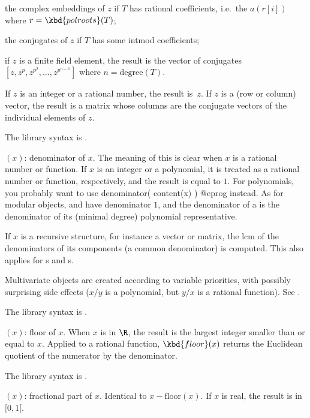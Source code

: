 \item the complex embeddings of $z$ if $T$ has rational coefficients,
i.e.~the $a(r[i])$ where $r = \kbd{polroots}(T)$;

\item the conjugates of $z$ if $T$ has some intmod coefficients;

\noindent if $z$ is a finite field element, the result is the vector of
conjugates $[z,z^p,z^{p^2},\ldots,z^{p^{n-1}}]$ where $n=\text{degree}(T)$.

\noindent If $z$ is an integer or a rational number, the result is~$z$. If
$z$ is a (row or column) vector, the result is a matrix whose columns are
the conjugate vectors of the individual elements of $z$.

The library syntax is .

$(x)$: \label{se:denominator}
denominator of $x$. The meaning of this
is clear when $x$ is a rational number or function. If $x$ is an integer
or a polynomial, it is treated as a rational number or function,
respectively, and the result is equal to $1$. For polynomials, you
probably want to use
\bprog
denominator( content(x) )
@eprog\noindent
instead. As for modular objects,  and  have
denominator $1$, and the denominator of a  is the denominator
of its (minimal degree) polynomial representative.

If $x$ is a recursive structure, for instance a vector or matrix, the lcm
of the denominators of its components (a common denominator) is computed.
This also applies for s and s.

 Multivariate objects are created according to variable
priorities, with possibly surprising side effects ($x/y$ is a polynomial, but
$y/x$ is a rational function). See .

The library syntax is .

$(x)$: \label{se:floor}
floor of $x$. When $x$ is in $\R$, the result is the
largest integer smaller than or equal to $x$. Applied to a rational function,
$\kbd{floor}(x)$ returns the Euclidean quotient of the numerator by the
denominator.

The library syntax is .

$(x)$: \label{se:frac}
fractional part of $x$. Identical to
$x-\text{floor}(x)$. If $x$ is real, the result is in $[0,1[$.

